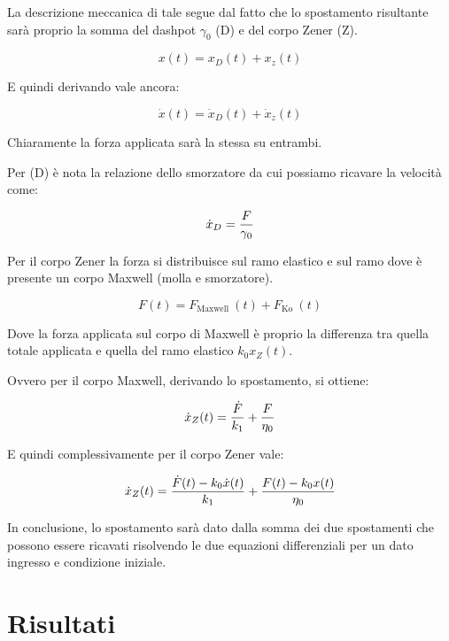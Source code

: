La descrizione meccanica di tale segue dal fatto che lo spostamento risultante sarà proprio la somma del dashpot $\gamma_0$ (D) e del corpo Zener (Z).

\begin{equation}
	{x}(t)={x}_{D}(t)+{x}_{z}(t)
\end{equation}

E quindi derivando vale ancora:

\begin{equation}
	\dot{x}(t)=\dot{x}_{D}(t)+\dot{x}_{z}(t)
\end{equation}

Chiaramente la forza applicata sarà la stessa su entrambi.

Per (D) è nota la relazione dello smorzatore da cui possiamo ricavare la velocità come:

\begin{equation}
	\dot{x}_D={F\over \gamma_0}
\end{equation}


Per il corpo Zener la forza si distribuisce sul ramo elastico e sul ramo dove è presente un corpo Maxwell (molla e smorzatore). 

\begin{equation}
	F(t)=F_{\text {Maxwell }}(t)+F_{\text {Ko }}(t)
\end{equation}
 
Dove la forza applicata sul corpo di Maxwell è proprio la differenza tra quella totale applicata e quella del ramo elastico $k_0 x_Z(t)$.

Ovvero per il corpo Maxwell, derivando lo spostamento, si ottiene: 

\begin{equation}
	\dot{x}_Z(t)={\dot F\over k_1}+{F\over \eta_0}
\end{equation} 

E quindi complessivamente per il corpo Zener vale:

\begin{equation}
	\dot{x}_Z(t)={\dot F(t)-k_0\dot x(t) \over k_1}+{F(t)-k_0 x(t)\over \eta_0}
	\label{eq:zener}
\end{equation} 


In conclusione, lo spostamento sarà dato dalla somma dei due spostamenti che possono essere ricavati risolvendo le due equazioni differenziali per un dato ingresso e condizione iniziale.

\section{Risultati}

